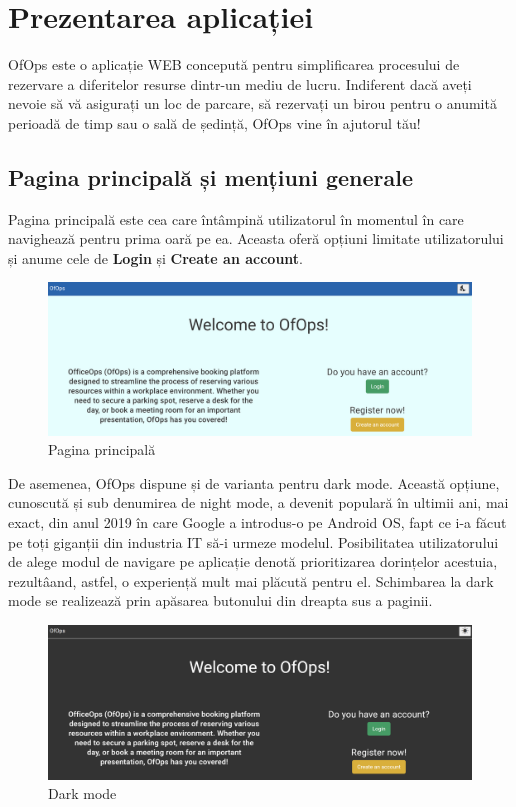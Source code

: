 \chapter{Prezentarea aplicației}

OfOps este o aplicație WEB concepută pentru simplificarea procesului de rezervare a diferitelor resurse dintr-un mediu de lucru. Indiferent dacă aveți nevoie să vă asigurați un loc de parcare, să rezervați un birou pentru o anumită perioadă de timp sau o sală de ședință, OfOps vine în ajutorul tău!

\section{Pagina principală și mențiuni generale}

Pagina principală este cea care întâmpină utilizatorul în momentul în care navighează pentru prima oară pe ea. Aceasta oferă opțiuni limitate utilizatorului și anume cele de \textbf{Login} și \textbf{Create an account}.

\begin{figure}[!htb]
    \centering
    \includegraphics[width=0.9\linewidth]{images/pagina-nelogat.png}
    \caption{Pagina principală}
    \label{fig:principal}
\end{figure}

De asemenea, OfOps dispune și de varianta pentru dark mode. Această opțiune, cunoscută și sub denumirea de night mode, a devenit populară în ultimii ani, mai exact, din anul 2019 în care Google a introdus-o pe Android OS, fapt ce i-a făcut pe toți giganții din industria IT să-i urmeze modelul.\cite{citation9} Posibilitatea utilizatorului de alege modul de navigare pe aplicație denotă prioritizarea dorințelor acestuia, rezultâand, astfel, o experiență mult mai plăcută pentru el. Schimbarea la dark mode se realizează prin apăsarea butonului din dreapta sus a paginii.

\begin{figure}[!htb]
    \centering
    \includegraphics[width=0.9\linewidth]{images/dark.png}
    \caption{Dark mode}
    \label{fig:dark}
\end{figure}

